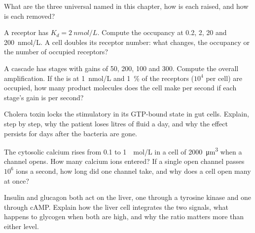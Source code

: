 \begin{exercise}[$\star$]\label{exo:b2:cell-signalling:4}
What are the three universal  named in this
chapter, how is each raised, and how is each removed?
\end{exercise}

\begin{exercise}[$\star\star$]\label{exo:b2:cell-signalling:5}
A receptor has $K_d = \qty{2}{nmol/L}$. Compute the occupancy at
0.2, 2, 20 and \qty{200}{nmol/L}. A cell doubles its receptor number:
what changes, the occupancy or the number of occupied receptors?
\end{exercise}

\begin{exercise}[$\star\star$]\label{exo:b2:cell-signalling:6}
A cascade has stages with gains of 50, 200, 100 and 300. Compute the
overall amplification. If the  is at \qty{1}{nmol/L} and
\qty{1}{\%} of the receptors ($10^{4}$ per cell) are occupied, how
many product molecules does the cell make per second if each stage's
gain is per second?
\end{exercise}

\begin{exercise}[$\star\star$]\label{exo:b2:cell-signalling:7}
Cholera toxin locks the stimulatory  in its GTP-bound
state in gut cells. Explain, step by step, why the patient loses
litres of fluid a day, and why the effect persists for days after
the bacteria are gone.
\end{exercise}

\begin{exercise}[$\star\star$]\label{exo:b2:cell-signalling:8}
The cytosolic calcium rises from \qty{0.1}{} to \qty{1}{\micro
mol/L} in a cell of \qty{2000}{\micro m^3} when a channel opens. How
many calcium ions entered? If a single open channel passes $10^{6}$
ions a second, how long did one channel take, and why does a cell
open many at once?
\end{exercise}

\begin{exercise}[$\star\star$]\label{exo:b2:cell-signalling:9}
Insulin and glucagon both act on the liver, one through a tyrosine
kinase and one through cAMP. Explain how the liver cell integrates
the two signals, what happens to glycogen when both are high, and
why the ratio matters more than either level.
\end{exercise}

